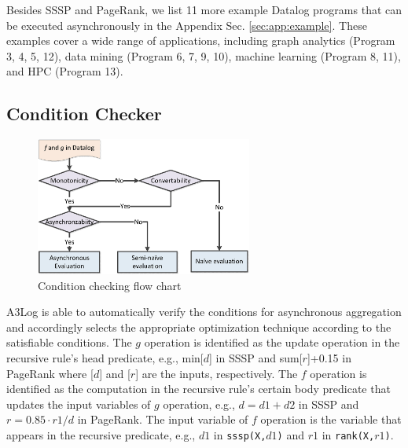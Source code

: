 Besides SSSP and PageRank, we list 11 more example Datalog programs that can be executed asynchronously in the Appendix Sec. \ref{sec:app:example}. These examples cover a wide range of applications, including graph analytics (Program 3, 4, 5, 12), data mining (Program 6, 7, 9, 10), machine learning (Program 8, 11), and HPC (Program 13).

\subsection{Condition Checker}
\label{sec:system:condition}

\begin{figure}[!t]
    \centering
  \includegraphics[width=2.8in]{fig/flow}
  \vspace{-0.1in}
  \caption{Condition checking flow chart}
  \label{fig:flow}
  \vspace{-0.2in}
\end{figure}

A3Log is able to automatically verify the conditions for asynchronous aggregation and accordingly selects the appropriate optimization technique according to the satisfiable conditions. The $g$ operation is identified as the update operation in the recursive rule's head predicate, e.g., min[$d$] in SSSP and sum[$r$]+0.15 in PageRank where [$d$] and [$r$] are the inputs, respectively. The $f$ operation is identified as the computation in the recursive rule's certain body predicate that updates the input variables of $g$ operation, e.g., $d=d1+d2$ in SSSP and $r=0.85\cdot r1/d$ in PageRank. The input variable of $f$ operation is the variable that appears in the recursive predicate, e.g., $d1$ in \texttt{sssp(X,$d1$)} and $r1$ in \texttt{rank(X,$r1$)}.


